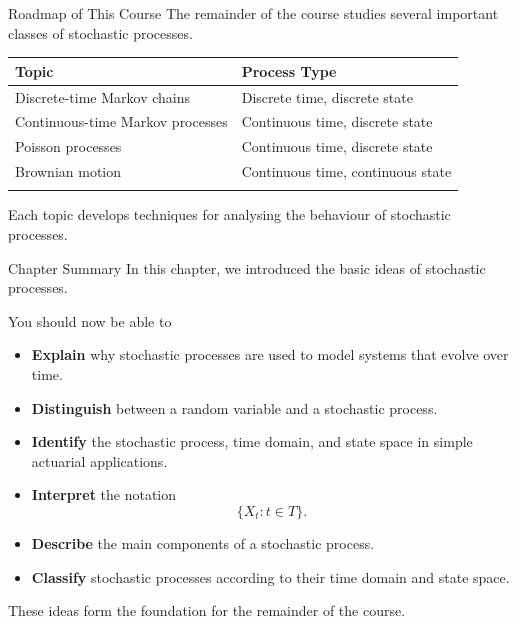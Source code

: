 \documentclass[
  ignorenonframetext,
  aspectratio=169,
]{beamer}
\newcounter{none} %
\providecommand{\tightlist}{%
  \setlength{\itemsep}{0pt}\setlength{\parskip}{0pt}}
\begin{document}
\begin{frame}{Roadmap of This Course}
\protect{}\label{roadmap-of-this-course}
The remainder of the course studies several important classes of
stochastic processes.

{\def\LTcaptype{none} %
\begin{longtable}[]{@{}ll@{}}
\toprule\noalign{}
Topic & Process Type \\
\midrule\noalign{}
\endhead
Discrete-time Markov chains & Discrete time, discrete state \\
Continuous-time Markov processes & Continuous time, discrete state \\
Poisson processes & Continuous time, discrete state \\
Brownian motion & Continuous time, continuous state \\
\bottomrule\noalign{}
\end{longtable}
}

Each topic develops techniques for analysing the behaviour of stochastic
processes.
\end{frame}

\begin{frame}{Chapter Summary}
\protect{}\label{chapter-summary}
In this chapter, we introduced the basic ideas of stochastic processes.

You should now be able to

\begin{itemize}
\tightlist
\item
  \textbf{Explain} why stochastic processes are used to model systems
  that evolve over time.
\item
  \textbf{Distinguish} between a random variable and a stochastic
  process.
\item
  \textbf{Identify} the stochastic process, time domain, and state space
  in simple actuarial applications.
\item
  \textbf{Interpret} the notation \[
  \{X_t:t\in T\}.
  \]
\item
  \textbf{Describe} the main components of a stochastic process.
\item
  \textbf{Classify} stochastic processes according to their time domain
  and state space.
\end{itemize}

These ideas form the foundation for the remainder of the course.
\end{frame}
\end{document}
